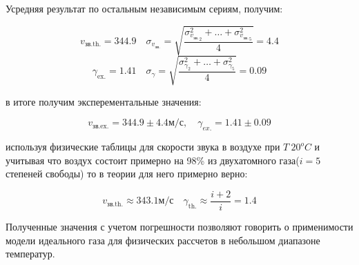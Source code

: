 \documentclass[10pt]{article}
\begin{document}
    Усредняя результат по остальным независимым сериям, получим:

    \begin{equation}
        v_\text{зв.th.} = 344.9 \quad \sigma_{v_\text{зв.}} = \sqrt{\frac{\sigma_{{v_\text{зв.}}_2}^2 + \dots + \sigma_{{v_\text{зв.}}_5}^2}{4}} = 4.4 
    \end{equation}
    \begin{equation}
        \gamma_\text{ex.} = 1.41 \quad \sigma_\gamma = \sqrt{\frac{\sigma_{\gamma_2}^2 + \dots + \sigma_{\gamma_5}^2}{4}} = 0.09 
    \end{equation}

    в итоге получим эксперементальные значения:

    \begin{equation}
        v_\text{зв.ex.} = 344.9 \pm 4.4 \text{м/с}, \quad \gamma_{ex.} = 1.41 \pm 0.09
    \end{equation}

    используя физические таблицы для скорости звука в воздухе при $T ~ 20^o C$ и
    учитывая что воздух состоит примерно на 98\% из двухатомного газа($i = 5$ степеней свободы) то в теории для него примерно верно:

    \begin{equation}
         v_\text{зв.th.} \approx 343.1 \text{м/с} \quad \gamma_\text{th.} \approx \frac{i+2}{i} = 1.4
    \end{equation}

    Полученные значения с учетом погрешности позволяют говорить о применимости модели идеального газа для физических рассчетов в небольшом диапазоне температур.
\end{document}
